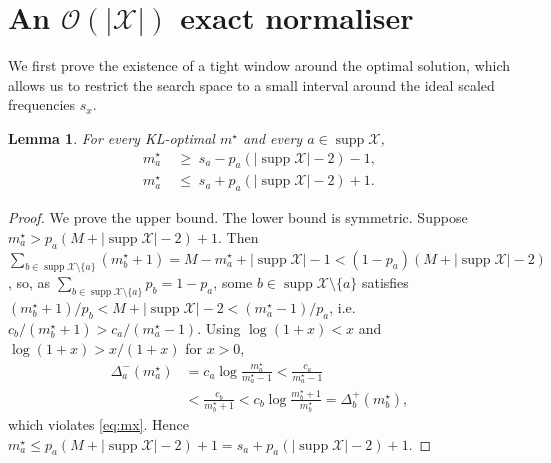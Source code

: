 \documentclass[final,5p]{elsarticle}
\newtheorem{lemma}{Lemma}
\DeclareMathOperator{\supp}{supp}
\begin{document}
\section{An \texorpdfstring{$\mathcal{O}(|\mathcal X|)$}{O(|X|)} exact normaliser}

We first prove the existence of a tight window around the optimal solution, which allows us to restrict the search space to a small interval around the ideal scaled frequencies $s_x$.

\begin{lemma}\label{lem:win}
For every KL-optimal $m^\star$ and every $a\in \supp \mathcal{X}$,
\[
\begin{aligned}
   m^\star_a\;&\ge\;s_a-p_a(|\supp \mathcal X|-2)-1,\\
   m^\star_a\;&\le\;s_a+p_a(|\supp \mathcal X|-2)+1 .
\end{aligned}
\]
\end{lemma}
\begin{proof}
We prove the upper bound. The lower bound is symmetric. Suppose
$m^\star_a>p_a(M+|\supp \mathcal X|-2)+1$. Then
$\sum_{b\in \supp \mathcal{X}\setminus\{a\}}(m^\star_b+1)=M-m^\star_a+|\supp \mathcal X|-1<(1-p_a)(M+|\supp \mathcal X|-2)$,
so, as $\sum_{b\in \supp \mathcal{X}\setminus\{a\}}p_b=1-p_a$, some $b\in \supp \mathcal{X}\setminus\{a\}$
satisfies
$(m^\star_b+1)/p_b<M+|\supp \mathcal X|-2<(m^\star_a-1)/p_a$, i.e.
$c_b/(m^\star_b+1)>c_a/(m^\star_a-1)$. Using $\log(1+x)<x$ and
$\log(1+x)>x/(1+x)$ for $x>0$,
\begin{equation}
\begin{aligned}
   \Delta^-_a(m^\star_a)&=c_a\log\tfrac{m^\star_a}{m^\star_a-1}
   <\tfrac{c_a}{m^\star_a-1}\\
   &<\tfrac{c_b}{m^\star_b+1}
   <c_b\log\tfrac{m^\star_b+1}{m^\star_b}=\Delta^+_b(m^\star_b),
\end{aligned}
\end{equation}
which violates \eqref{eq:mx}. Hence
$m^\star_a\le p_a(M+|\supp \mathcal X|-2)+1=s_a+p_a(|\supp \mathcal X|-2)+1$.
\end{proof}
\end{document}
